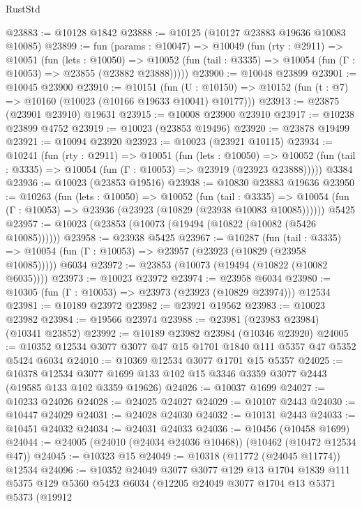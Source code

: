 \begin{lexlean}{RustStd}
\begin{coremodule}
@23883 := @10128 @1842
@23888 := @10125 (@10127 @23883 @19636 @10083 @10085)
@23899 := fun (params : @10047) =>
  @10049
    (fun (rty : @2911) =>
    @10051
      (fun (lets : @10050) =>
      @10052 (fun (tail : @3335) => @10054 (fun (Γ : @10053) => @23855 (@23882 @23888)))))
@23900 := @10048 @23899
@23901 := @10045 @23900
@23910 := @10151
    (fun (U : @10150) => @10152 (fun (t : @7) => @10160 (@10023 (@10166 @19633 @10041) @10177)))
@23913 := @23875 (@23901 @23910) @19631
@23915 := @10008 @23900 @23910
@23917 := @10238 @23899 @4752
@23919 := @10023 (@23853 @19496)
@23920 := @23878 @19499
@23921 := @10094 @23920
@23923 := @10023 (@23921 @10115)
@23934 := @10241
    (fun (rty : @2911) =>
    @10051
      (fun (lets : @10050) =>
      @10052 (fun (tail : @3335) => @10054 (fun (Γ : @10053) => @23919 (@23923 @23888)))))
    @3384
@23936 := @10023 (@23853 @19516)
@23938 := @10830 @23883 @19636
@23950 := @10263
    (fun (lets : @10050) =>
    @10052
      (fun (tail : @3335) =>
      @10054 (fun (Γ : @10053) => @23936 (@23923 (@10829 (@23938 @10083 @10085))))))
    @5425
@23957 := @10023 (@23853 (@10073 (@19494 (@10822 (@10082 (@5426 @10085))))))
@23958 := @23938 @5425
@23967 := @10287
    (fun (tail : @3335) => @10054 (fun (Γ : @10053) => @23957 (@23923 (@10829 (@23958 @10085)))))
    @6034
@23972 := @23853 (@10073 (@19494 (@10822 (@10082 @6035))))
@23973 := @10023 @23972
@23974 := @23958 @6034
@23980 := @10305 (fun (Γ : @10053) => @23973 (@23923 (@10829 @23974))) @12534
@23981 := @10189 @23972
@23982 := @23921 @19562
@23983 := @10023 @23982
@23984 := @19566 @23974
@23988 := @23981 (@23983 @23984) (@10341 @23852)
@23992 := @10189 @23982 @23984 (@10346 @23920)
@24005 := @10352 @12534 @3077 @3077 @47 @15 @1701 @1840 @111 @5357 @47 @5352 @5424 @6034
@24010 := @10369 @12534 @3077 @1701 @15 @5357
@24025 := @10378
    @12534
    @3077
    @1699
    @133
    @102
    @15
    @3346
    @3359
    @3077
    @2443
    (@19585 @133 @102 @3359 @19626)
@24026 := @10037 @1699
@24027 := @10233 @24026
@24028 := @24025 @24027
@24029 := @10107 @2443
@24030 := @10447 @24029
@24031 := @24028 @24030
@24032 := @10131 @2443
@24033 := @10451 @24032
@24034 := @24031 @24033
@24036 := @10456 (@10458 @1699)
@24044 := @24005 (@24010 (@24034 @24036 @10468)) (@10462 (@10472 @12534 @47))
@24045 := @10323 @15
@24049 := @10318 (@11772 (@24045 @11774)) @12534
@24096 := @10352
    @24049
    @3077
    @3077
    @129
    @13
    @1704
    @1839
    @111
    @5375
    @129
    @5360
    @5423
    @6034
    (@12205
      @24049
      @3077
      @1704
      @13
      @5371
      @5373
      (@19912

\end{coremodule}
\end{lexlean}

